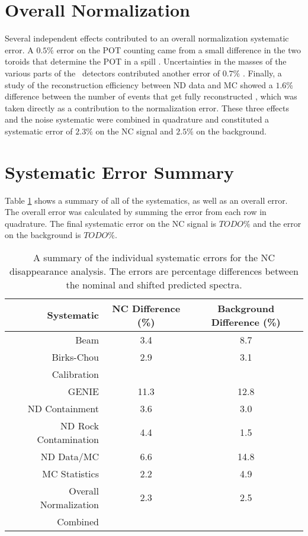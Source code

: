 \begin{doublespace}
\section{Overall Normalization}

Several independent effects contributed to an overall normalization systematic error. A $0.5\%$ error on the POT counting came from a small difference in the two toroids that determine the POT in a spill \cite{ref:TNBeam}. Uncertainties in the masses of the various parts of the \nova~detectors contributed another error of $0.7\%$ \cite{ref:MassError}. Finally, a study of the reconstruction efficiency between ND data and MC showed a $1.6\%$ difference between the number of events that get fully reconstructed \cite{ref:NDDataMCRecoEff}, which was taken directly as a contribution to the normalization error. These three effects and the noise systematic were combined in quadrature and constituted a systematic error of $2.3\%$ on the NC signal and $2.5\%$ on the background.

\section{Systematic Error Summary}

Table \ref{tab:SystSummary} shows a summary of all of the systematics, as well as an overall error. The overall error was calculated by summing the error from each row in quadrature. The final systematic error on the NC signal is $TODO\%$ and the error on the background is $TODO\%$.
\begin{table}[h]
  \begin{center}
    \caption[Systematic Error Summary]{A summary of the individual systematic errors for the NC disappearance analysis. The errors are percentage differences between the nominal and shifted predicted spectra.}
    \label{tab:SystSummary}
    \begin{tabular}{r c c}
      \hline\hline
      Systematic & NC Difference (\%) & Background Difference (\%) \\
      \hline
      Beam & 3.4 & 8.7 \\
      Birks-Chou & 2.9 & 3.1 \\
      Calibration & & \\
      GENIE & 11.3 & 12.8 \\
      ND Containment & 3.6 & 3.0 \\
      ND Rock Contamination & 4.4 & 1.5 \\
      ND Data/MC & 6.6 & 14.8 \\
      MC Statistics & 2.2 & 4.9 \\
      Overall Normalization & 2.3 & 2.5 \\
      \hline
      Combined & & \\
      \hline
    \end{tabular}
  \end{center}
\end{table}


\end{doublespace}
